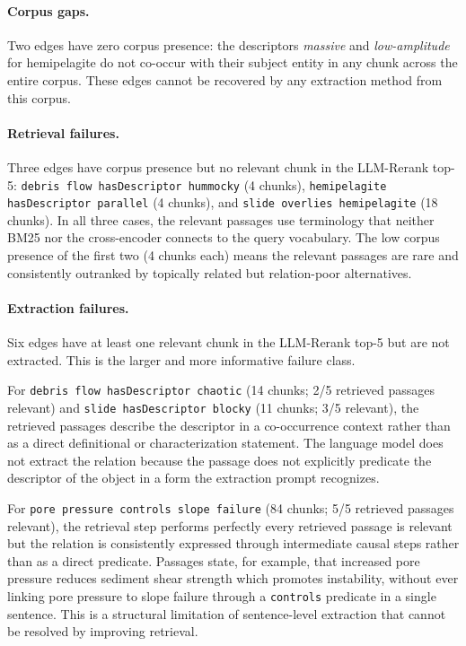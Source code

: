 \documentclass[10pt]{article}
\newcommand{\pred}[1]{\texttt{\small #1}}
\begin{document}
\paragraph{Corpus gaps.}
Two edges have zero corpus presence: the descriptors
\emph{massive} and \emph{low-amplitude} for
hemipelagite do not co-occur with their subject entity
in any chunk across the entire corpus.
These edges cannot be recovered by any extraction
method from this corpus.

\paragraph{Retrieval failures.}
Three edges have corpus presence but no relevant chunk
in the LLM-Rerank top-5: \pred{debris flow hasDescriptor
hummocky} (4 chunks), \pred{hemipelagite hasDescriptor
parallel} (4 chunks), and \pred{slide overlies
hemipelagite} (18 chunks).
In all three cases, the relevant passages use
terminology that neither BM25 nor the cross-encoder
connects to the query vocabulary.
The low corpus presence of the first two (4 chunks
each) means the relevant passages are rare and
consistently outranked by topically related but
relation-poor alternatives.

\paragraph{Extraction failures.}
Six edges have at least one relevant chunk in the LLM-Rerank
top-5 but are not extracted.
This is the larger and more informative failure class.

For \pred{debris flow hasDescriptor chaotic} (14
chunks; 2/5 retrieved passages relevant) and
\pred{slide hasDescriptor blocky} (11 chunks; 3/5
relevant), the retrieved passages describe the
descriptor in a co-occurrence context rather than as
a direct definitional or characterization statement.
The language model does not extract the relation
because the passage does not explicitly predicate the
descriptor of the object in a form the extraction
prompt recognizes.

For \pred{pore pressure controls slope failure}
(84 chunks; 5/5 retrieved passages relevant), the
retrieval step performs perfectly  every retrieved
passage is relevant  but the relation is
consistently expressed through intermediate causal
steps rather than as a direct predicate.
Passages state, for example, that increased pore
pressure reduces sediment shear strength which
promotes instability, without ever linking pore
pressure to slope failure through a \pred{controls}
predicate in a single sentence.
This is a structural limitation of sentence-level
extraction that cannot be resolved by improving
retrieval.
\end{document}
